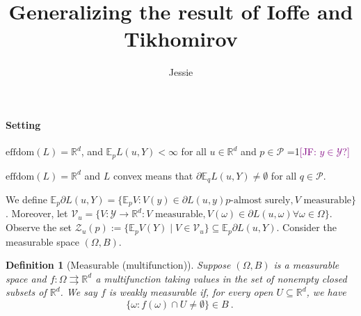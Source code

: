 \documentclass{article}
\title{Generalizing the result of Ioffe and Tikhomirov}
\author{Jessie}
\newcommand{\Comments}{1}
\newcommand{\mynote}[2]{\ifnum\Comments=1\textcolor{#1}{#2}\fi}
\newcommand{\jessie}[1]{\mynote{purple}{[JF: #1]}}
\newcommand{\reals}{\mathbb{R}}
\newcommand{\effdom}{\mathrm{effdom}}
\newcommand{\B}{\mathcal{B}}
\newcommand{\E}{\mathbb{E}}
\renewcommand{\P}{\mathcal{P}}
\newcommand{\V}{\mathcal{V}}
\newcommand{\Y}{\mathcal{Y}}
\newcommand{\Z}{\mathcal{Z}}
\newcommand{\toto}{\rightrightarrows}
\newtheorem{definition}{Definition}
\begin{document}
\maketitle
\paragraph{Setting} 
$\effdom(L) = \reals^d$, and $\E_p L(u,Y) < \infty$ for all $u \in \reals^d$ and $p \in \P$ \jessie{$y \in \Y$?}

$\effdom(L) = \reals^d$ and $L$ convex means that $\partial \E_q L(u,Y) \neq \emptyset$ for all $q \in \P$.

We define $\E_p \partial L(u,Y) = \{\E_p V: V(y) \in \partial L(u,y) p\text{-almost surely}, V \text{ measurable}\}$.
Moreover, let $\V_{u} = \{V : \Y \to \reals^d : V \text{ measurable}, V(\omega) \in \partial L(u,\omega) \forall \omega \in \Omega\}$.
Observe the set $\Z_u(p) := \{\E_p V(Y) \mid V \in \V_u\} \subseteq \E_p \partial L(u,Y)$.
Consider the measurable space $(\Omega, B)$. 

\begin{definition}[Measurable (multifunction)]
	Suppose $(\Omega, B)$ is a measurable space and $f:\Omega \toto \reals^d$ a multifunction taking values in the set of nonempty closed subsets of $\reals^d$.
	We say $f$ is weakly measurable if, for every open $U \subseteq \reals^d$, we have
	\begin{equation*}
	\{\omega : f(\omega) \cap U \neq \emptyset\} \in B~.~
	\end{equation*}
\end{definition}
\end{document}
